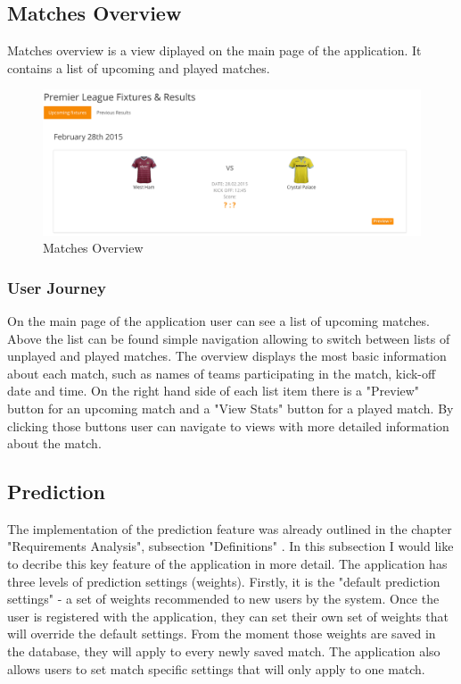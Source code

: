\subsection{Matches Overview}
Matches overview is a view diplayed on the main page of the application. It contains a list of upcoming and played matches.

\begin{figure}[H]
\begin{center}
\includegraphics[width=.90\linewidth,natwidth=610,natheight=642]{impl/images/matchesOverviewExample}
\caption{Matches Overview} \label{fig:using:matchesoverview}
\end{center}
\end{figure}

\subsubsection{User Journey}
On the main page of the application user can see a list of upcoming matches. Above the list can be found simple navigation allowing to switch between lists of unplayed and played matches. The overview displays the most basic information about each match, such as names of teams participating in the match, kick-off date and time. On the right hand side of each list item there is a "Preview" button for an upcoming match and a "View Stats" button for a played match. By clicking those buttons user can navigate to views with more detailed information about the match. 

\subsection{Prediction}
The implementation of the prediction feature was already outlined in the chapter "Requirements Analysis", subsection "Definitions" \cite{subsec:definitions}. In this subsection I would like to decribe this key feature of the application in more detail. The application has three levels of prediction settings (weights). Firstly, it is the "default prediction settings" - a set of weights recommended to new users by the system. Once the user is registered with the application, they can set their own set of weights that will override the default settings. From the moment those weights are saved in the database, they will apply to every newly saved match. The application also allows users to set match specific settings that will only apply to one match. 
 
